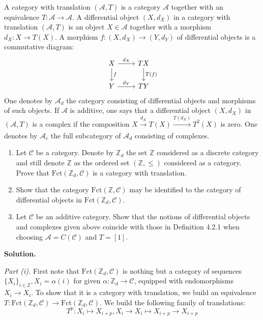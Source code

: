 \documentclass{category-template}
\begin{document}
\begin{problem}
    A category with translation $(\mathcal{A},T)$ is a category $\mathcal{A}$
    together with an equivalence $T: \mathcal{A} \to \mathcal{A}$. A
    differential object $(X,d_X)$ in a category with translation
    $(\mathcal{A},T)$ is an object $X \in \mathcal{A}$ together with 
    a morphism $d_X: X \to T(X)$. A morphism $f: (X,d_X) \to (Y,d_Y)$ of 
    differential objects is a commutative diagram:
    \[
    \begin{tikzcd}
        {X} \arrow{r}{d_X} \arrow{d}{f} & {TX} \arrow{d}{T(f)} \\
        {Y} \arrow{r}{d_Y} & {TY} 
    \end{tikzcd}
    \]
    One denotes by $\mathcal{A}_d$ the category consisting of differential
    objects and morphisms of such objects. If $\mathcal{A}$ is additive, one
    says that a differential object $(X,d_X)$ in $(\mathcal{A},T)$ is a complex
    if the composition $X \xrightarrow[]{d_X} T(X) \xrightarrow[]{T(d_X)} T^2(X)$ is
    zero. One denotes by $\mathcal{A}_c$ the full subcategory of $\mathcal{A}_d$ 
    consisting of complexes.
    \begin{enumerate}
        \item Let $\mathcal{C}$ be a category. Denote by $\mathbb{Z}_d$ the set 
        $\mathbb{Z}$ considered as a discrete category and still denote 
        $\mathbb{Z}$ as the ordered set $(\mathbb{Z},\leq)$ considered as 
        a category. Prove that $\text{Fct}(\mathbb{Z}_d,\mathcal{C})$ is 
        a category with translation.
        \item Show that the category $\text{Fct}(\mathbb{Z}, \mathcal{C})$ may
        be identified to the category of differential objects in
        $\text{Fct}(\mathbb{Z}_d, \mathcal{C})$.
        \item Let $\mathcal{C}$ be an additive category. Show that the notions
        of differential objects and complexes given above coincide with those in
        Definition 4.2.1 when choosing $\mathcal{A} = C(\mathcal{C})$ and $T =
        [1]$.
    \end{enumerate}
\end{problem}

\textbf{Solution.}

\textit{Part (i).} First note that $\text{Fct}(\mathbb{Z}_d,\mathcal{C})$ is
nothing but a category of sequences $\{X_i\}_{i \in \mathbb{Z}}, X_i =
\alpha(i)$ for given $\alpha: \mathbb{Z}_d \to \mathcal{C}$, equipped with
endomorphisms $X_i \to X_i$. To show that it is a category with translation, we
build an equivalence $T: \text{Fct}(\mathbb{Z}_d,\mathcal{C}) \to
\text{Fct}(\mathbb{Z}_d,\mathcal{C})$. We build the following 
family of translations:
\begin{equation*}
    T^p: X_i \mapsto X_{i+p}, X_i \to X_i \mapsto X_{i+p} \to X_{i+p}
\end{equation*}
\end{document}
